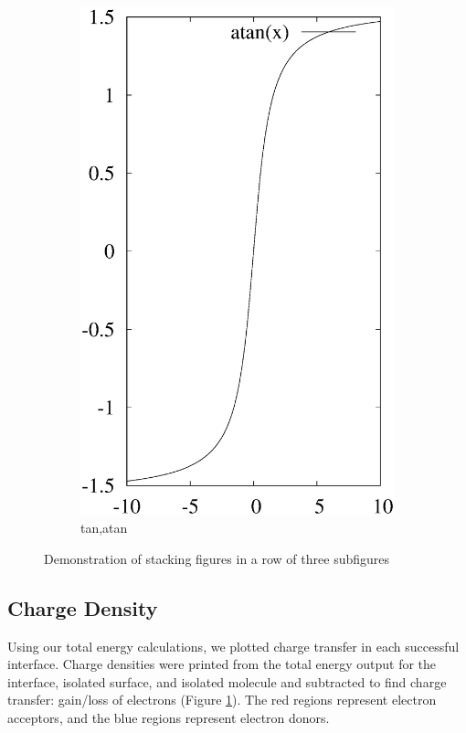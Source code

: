 \documentclass[letterpaper,showpacs,prb,preprint]{revtex4}
\begin{document}
\begin{figure}[ht]
\begin{subfigure}{0.3\textwidth}
\includegraphics [width=\textwidth]{atan.eps}
\caption{tan,atan}
\end{subfigure}
\caption{Demonstration of stacking figures in a row of three subfigures}
\label{figure1}
\end{figure}


\subsection{Charge Density}

Using our total energy calculations, 
we plotted charge transfer in each successful interface. 
Charge densities were printed from the total energy output for the interface, isolated surface, 
and isolated molecule and subtracted to find charge transfer: gain/loss of electrons (Figure \ref{figure1}). 
The red regions represent electron acceptors, and the blue regions represent electron donors. 
\end{document}
